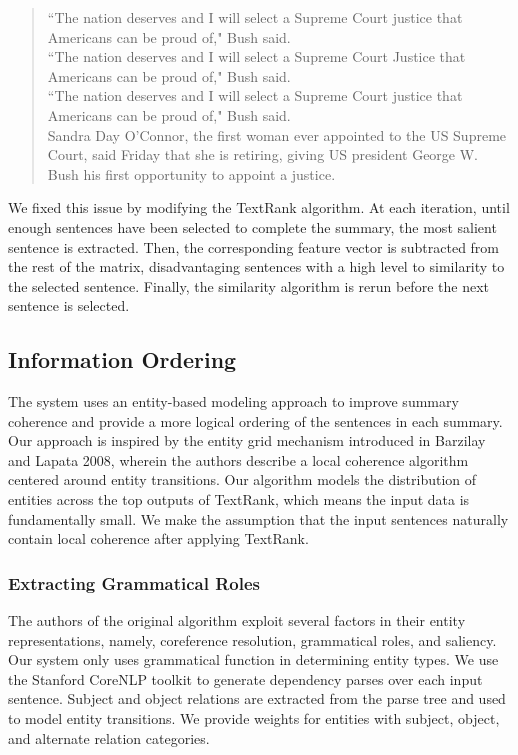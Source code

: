 \documentclass[11pt]{article}
\begin{document}
\begin{quote}
``The nation deserves and I will select a Supreme Court justice that Americans can be proud of," Bush said.\\
``The nation deserves and I will select a Supreme Court Justice that Americans can be proud of," Bush said.\\
``The nation deserves and I will select a Supreme Court justice that Americans can be proud of," Bush said.\\
Sandra Day O'Connor, the first  woman ever appointed to the US Supreme Court, said Friday that she is retiring, giving US president George W. Bush his first  opportunity to appoint a justice.
\end{quote}

We fixed this issue by modifying the TextRank algorithm. At each iteration, until enough sentences have been selected to complete the summary, the most salient sentence is extracted. Then, the corresponding feature vector is subtracted from the rest of the matrix, disadvantaging sentences with a high level to similarity to the selected sentence. Finally, the similarity algorithm is rerun before the next sentence is selected.\\

\subsection{Information Ordering}
The system uses an entity-based modeling approach to improve summary coherence and provide a more logical ordering of the sentences in each summary. Our approach is inspired by the entity grid mechanism introduced in Barzilay and Lapata 2008, wherein the authors describe a local coherence algorithm centered around entity transitions. Our algorithm models the distribution of entities across the top outputs of TextRank, which means the input data is fundamentally small. We make the assumption that the input sentences naturally contain local coherence after applying TextRank. 

\subsubsection{Extracting Grammatical Roles}
The authors of the original algorithm exploit several factors in their entity representations, namely, coreference resolution, grammatical roles, and saliency. Our system only uses grammatical function in determining entity types. We use the Stanford CoreNLP toolkit to generate dependency parses over each input sentence. Subject and object relations are extracted from the parse tree and used to model entity transitions. We provide weights for entities with subject, object, and alternate relation categories.
\end{document}
